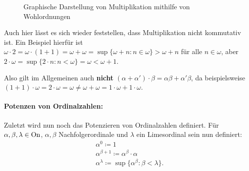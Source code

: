 \begin{figure}[h]
	\begin{center}
	\end{center}
	\caption{Graphische Darstellung von Multiplikation mithilfe von Wohlordnungen}
	\label{MultiplikationWO}
\end{figure}

Auch hier lässt es sich wieder feststellen, dass Multiplikation nicht kommutativ ist. Ein Beispiel hierfür ist $\omega\cdot 2=\omega\cdot(1+1)=\omega+\omega=\sup\{\omega+n : n\in\omega\}>\omega+n$ für alle $n\in\omega$, aber $2\cdot\omega=\sup\{2\cdot n : n<\omega\}=\omega<\omega+1$.

Also gilt im Allgemeinen auch \textbf{nicht} $(\alpha+\alpha')\cdot\beta=\alpha\beta+\alpha'\beta$, da beispielsweise $(1+1)\cdot\omega=2\cdot\omega=\omega \neq \omega+\omega = 1\cdot\omega+1\cdot\omega$.\\

\paragraph{Potenzen von Ordinalzahlen:} Zuletzt wird nun noch das Potenzieren von Ordinalzahlen definiert. Für $\alpha,\beta,\lambda\in \operatorname{On}$, $\alpha, \beta$ Nachfolgerordinale und $\lambda$ ein Limesordinal sein nun definiert:
\begin{align*}
	&\alpha^0\coloneqq1\\
	&\alpha^{\beta+1}\coloneqq\alpha^\beta\cdot\alpha\\
	&\alpha^\lambda\coloneqq\sup\{\alpha^\beta:\beta<\lambda\}.
\end{align*}

